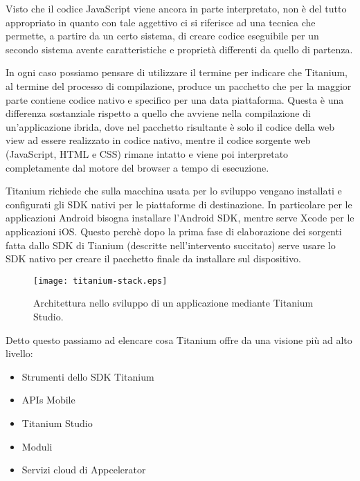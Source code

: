 			Visto che il codice JavaScript viene ancora in parte interpretato, 
			\crosscomp{} non è del tutto appropriato in quanto con tale 
			aggettivo ci si riferisce ad una tecnica che permette, a partire da 
			un certo sistema, di creare codice eseguibile per un secondo sistema 
			avente caratteristiche e proprietà differenti da quello di 
			partenza\citep{Web:Wiki.cross-compiling}.
			
			In ogni caso possiamo pensare di utilizzare il termine 
			\crosscomp{} per indicare che Titanium, al termine del processo di 
			compilazione, produce un pacchetto che per la 
			maggior parte contiene codice nativo e specifico per una data 
			piattaforma. Questa è una differenza sostanziale rispetto a quello 
			che avviene nella compilazione di un'applicazione ibrida, dove nel 
			pacchetto risultante è solo il codice della web view ad essere 
			realizzato in codice nativo, mentre il codice sorgente web 
			(JavaScript, HTML e CSS) rimane intatto e viene poi interpretato 
			completamente dal motore del browser a tempo di esecuzione.
			
			Titanium richiede che sulla macchina usata per lo sviluppo vengano 
			installati e configurati gli SDK nativi per le piattaforme di destinazione.
			In particolare per le applicazioni Android bisogna installare 
			l'Android SDK, mentre serve Xcode per le applicazioni iOS.
			Questo perchè dopo la prima fase di elaborazione dei sorgenti fatta
			dallo SDK di Tianium (descritte nell'intervento succitato) serve usare
			lo SDK nativo per creare il pacchetto finale da installare sul 
			dispositivo.
			\begin{figure}[h]
				\centering
				\texttt{[image: titanium-stack.eps]}
				\caption{
					Architettura nello sviluppo di un applicazione \crossplat{} 
					mediante Titanium Studio.
				}
				\label{fig:ti_stack}
			\end{figure}
			 
			\noindent Detto questo passiamo ad elencare cosa Titanium offre da 
			una visione più ad alto livello\citep[Cap.2 - Titanium 
			Mobile Overview]{Book:Ti}:
			\begin{itemize}
				\item Strumenti dello SDK Titanium
				\item APIs Mobile
				\item Titanium Studio
				\item Moduli
				\item Servizi cloud di Appcelerator
			\end{itemize}
	
